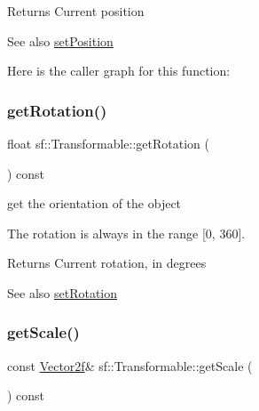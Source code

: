 \begin{DoxyReturn}{Returns}
Current position
\end{DoxyReturn}
\begin{DoxySeeAlso}{See also}
\hyperlink{classsf_1_1_transformable_a4dbfb1a7c80688b0b4c477d706550208}{set\+Position} 
\end{DoxySeeAlso}
Here is the caller graph for this function\+:
\mbox{\label{classsf_1_1_transformable_aa00b5c5d4a06ac24a94dd72c56931d3a}} 
\subsubsection{\texorpdfstring{get\+Rotation()}{getRotation()}}
{\footnotesize\ttfamily float sf\+::\+Transformable\+::get\+Rotation (\begin{DoxyParamCaption}{ }\end{DoxyParamCaption}) const}



get the orientation of the object 

The rotation is always in the range \mbox{[}0, 360\mbox{]}.

\begin{DoxyReturn}{Returns}
Current rotation, in degrees
\end{DoxyReturn}
\begin{DoxySeeAlso}{See also}
\hyperlink{classsf_1_1_transformable_a32baf2bf1a74699b03bf8c95030a38ed}{set\+Rotation} 
\end{DoxySeeAlso}
\mbox{\label{classsf_1_1_transformable_a73819fdea80ca8a06fad8a0067b4588c}} 
\subsubsection{\texorpdfstring{get\+Scale()}{getScale()}}
{\footnotesize\ttfamily const \hyperlink{classsf_1_1_vector2}{Vector2f}\& sf\+::\+Transformable\+::get\+Scale (\begin{DoxyParamCaption}{ }\end{DoxyParamCaption}) const}



